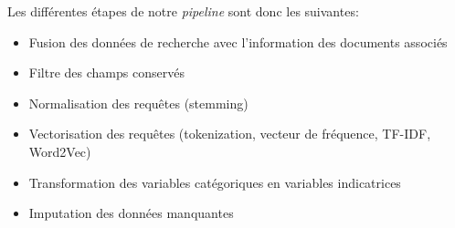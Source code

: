 Les différentes étapes de notre \emph{pipeline} sont donc les suivantes:
\begin{itemize}
	\item Fusion des données de recherche avec l'information des documents associés
	\item Filtre des champs conservés
	\item Normalisation des requêtes (stemming)
	\item Vectorisation des requêtes (tokenization, vecteur de fréquence, TF-IDF, Word2Vec)
	\item Transformation des variables catégoriques en variables indicatrices
	\item Imputation des données manquantes
\end{itemize}
	

